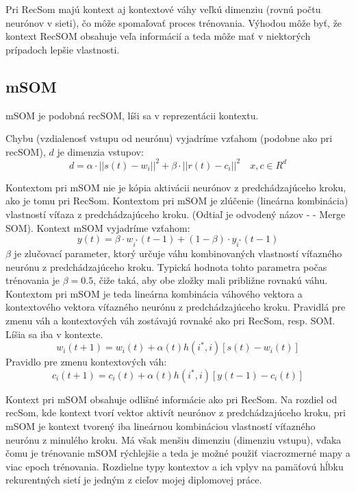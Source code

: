 Pri RecSom majú kontext aj kontextové váhy veľkú dimenziu (rovnú počtu neurónov v sieti), čo môže spomaľovať
proces trénovania.
Výhodou môže byť, že kontext RecSOM obsahuje veľa informácií a teda môže mať v niektorých prípadoch
lepšie vlastnosti. 


\subsection{mSOM}
mSOM je podobná recSOM, líši sa v reprezentácii kontextu. \cite{DBLP:journals/ijon/StrickertH05}

Chybu (vzdialenosť vstupu od neurónu) vyjadríme vzťahom (podobne ako pri recSOM), 
$d$ je dimenzia vstupov:
\begin{equation}
	d = \alpha \cdot ||s(t) - w_i||^{2} + \beta \cdot ||r(t) - c_i||^{2} \quad x, c \in R^{d}
\end{equation}

Kontextom pri mSOM nie je kópia aktivácii neurónov z predchádzajúceho kroku, ako je tomu pri RecSom. 
Kontextom pri mSOM je zlúčenie (lineárna kombinácia) vlastností víťaza z predchádzajúceho kroku.
(Odtiaľ je odvodený názov -  - Merge SOM). 
Kontext mSOM vyjadríme vzťahom:
\begin{equation}
	y(t) = \beta \cdot w_{i^{*}}(t-1) + (1 - \beta) \cdot y_{i^{*}}(t-1)
\end{equation}
$\beta$ je zlučovací parameter, ktorý určuje váhu kombinovaných vlastností
víťazného neurónu z predchádzajúceho kroku. Typická hodnota tohto parametra
počas trénovania je $\beta = 0.5$, čiže taká, aby obe zložky mali približne 
rovnakú váhu. Kontextom pri mSOM je teda lineárna kombinácia váhového vektora a 
kontextového vektora víťazného neurónu z predchádzajúceho kroku.
Pravidlá pre zmenu váh a kontextových váh zostávajú rovnaké ako pri RecSom, resp. SOM. Líšia sa iba v kontexte.
\begin{equation}
	w_i(t + 1) = w_i(t) + \alpha(t)h(i^*, i)[s(t) - w_i(t)]
\end{equation}
Pravidlo pre zmenu kontextových váh:
\begin{equation}
	c_i(t + 1) = c_i(t) + \alpha(t)h(i^*, i)[y(t - 1) - c_i(t)]
\end{equation}

Kontext pri mSOM obsahuje odlišné informácie ako pri RecSom.
Na rozdiel od recSom, kde kontext tvorí vektor aktivít neurónov z predchádzajúceho kroku, pri
mSOM je kontext tvorený iba lineárnou kombináciou vlastností víťazného neurónu z minulého kroku.
Má však menšiu dimenziu (dimenziu vstupu), vďaka čomu je trénovanie mSOM rýchlejšie a teda je možné použiť 
viacrozmerné mapy a viac epoch trénovania. Rozdielne typy kontextov a ich 
vplyv na pamäťovú hĺbku rekurentných sietí je jedným z cieľov mojej diplomovej práce.
